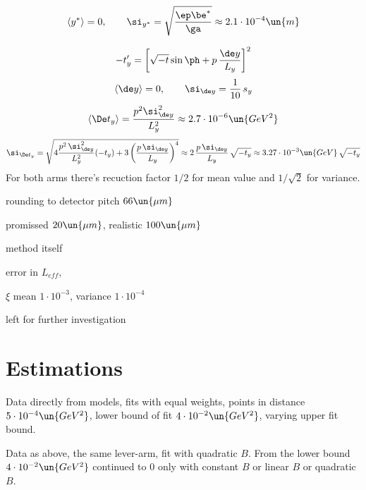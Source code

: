 $$\langle y^*\rangle = 0, \qquad \si_{y^*} = \sqrt{\ep\be^*\over\ga} \approx 2.1\cdot10^{-4}\un{m}$$

$$-t_y' = \left[ \sqrt{-t}\sin\ph + p\,{\de y\over L_y} \right]^2$$
$$\langle\de y\rangle = 0, \qquad \si_{\de y} = {1\over 10}\, s_y$$
$$\langle\De t_y\rangle = {p^2 \si_{\de y}^2\over L_y^2} \approx 2.7\cdot10^{-6}\un{GeV^2}$$
$$\si_{\De t_y} = \sqrt{4{p^2\, \si_{\de y}^2\over L_y^2} (-t_y) + 3 \left(p\,\si_{\de y}\over L_y\right)^4}\approx 2\,{p\,\si_{\de y}\over L_y}\,\sqrt{-t_y} \approx 3.27\cdot10^{-3}\un{GeV}\,\sqrt{-t_y}$$
For both arms there's recuction factor $1/2$ for mean value and $1/\sqrt{2}$ for variance.


rounding to detector pitch $66\un{\mu m}$

promissed $20\un{\mu m}$, realistic $100\un{\mu m}$

method itself

error in $L_{eff}$, 

$\xi$ mean $1\cdot10^{-3}$, variance $1\cdot10^{-4}$

left for further investigation

\vfil\eject


\section{Estimations}

Data directly from models, fits with equal weights, points in distance $5\cdot10^{-4}\un{GeV^{2}}$, lower bound of fit $4\cdot10^{-2}\un{GeV^2}$, varying upper fit bound.

\vfill\eject

Data as above, the same lever-arm, fit with quadratic $B$. From the lower bound $4\cdot10^{-2}\un{GeV^2}$ continued to $0$ only with constant $B$ or linear $B$ or quadratic $B$.

